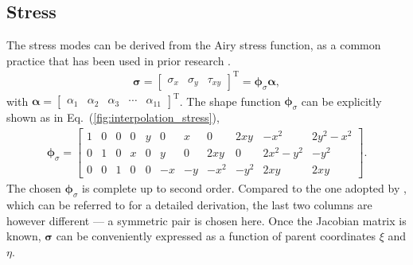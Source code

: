 \documentclass[3p,sort&compress,review,11pt]{elsarticle}
\newcommand*{\mT}{\mathrm{T}}
\newcommand*{\eqsref}[1]{Eq.~(\ref{#1})}
\newcommand*{\mb}{\bm}
\begin{document}
\subsection{Stress}
The stress modes can be derived from the Airy stress function, as a common practice that has been used in prior research \citep[see, e.g.,][]{Fu2010,Cen2011,Nodargi2017}.
\begin{gather}
\mb{\sigma}=\begin{bmatrix}
	\sigma_x & \sigma_y & \tau_{xy}
\end{bmatrix}^\mT=\mb{\phi}_\sigma\mb{\alpha},
\end{gather}
with $\mb{\alpha}=\begin{bmatrix}
	\alpha_1 & \alpha_2 & \alpha_3 & \cdots & \alpha_{11}
\end{bmatrix}^\mT$. The shape function $\mb{\phi}_\sigma$ can be explicitly shown as in \eqsref{fig:interpolation_stress},
\begin{gather}\label{fig:interpolation_stress}
\mb{\phi}_\sigma=
\left[\begin{array}{ccc|cc|cc|cc|cc}
	1 & 0 & 0 & 0 & y & 0  & x  &  0   & 2xy  &   -x^2   & 2y^2-x^2 \\
	0 & 1 & 0 & x & 0 & y  & 0  & 2xy  &  0   & 2x^2-y^2 &   -y^2   \\
	0 & 0 & 1 & 0 & 0 & -x & -y & -x^2 & -y^2 &   2xy    &   2xy
\end{array}\right].
\end{gather}
The chosen $\mb{\phi}_\sigma$ is complete up to second order. Compared to the one adopted by \citet{Fu2010}, which can be referred to for a detailed derivation, the last two columns are however different --- a symmetric pair is chosen here. Once the Jacobian matrix is known, $\mb{\sigma}$ can be conveniently expressed as a function of parent coordinates $\xi$ and $\eta$.
\end{document}
